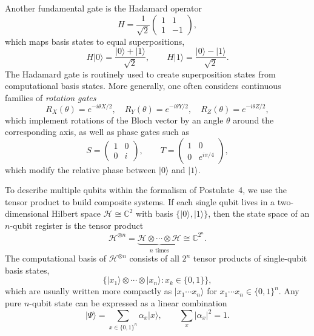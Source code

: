 \documentclass[12pt,a4paper,openany]{report}
\newcommand{\ket}[1]{\lvert #1 \rangle}
\begin{document}
Another fundamental gate is the Hadamard operator
\begin{equation}
  H = \frac{1}{\sqrt{2}}\begin{pmatrix} 1 & 1 \\ 1 & -1 \end{pmatrix},
\end{equation}
which maps basis states to equal superpositions,
\begin{equation}
  H\ket{0} = \frac{\ket{0} + \ket{1}}{\sqrt{2}}, \qquad
  H\ket{1} = \frac{\ket{0} - \ket{1}}{\sqrt{2}}.
\end{equation}
The Hadamard gate is routinely used to create superposition states from computational basis states. More generally, one often considers continuous families of \emph{rotation gates}
\begin{equation}
  R_X(\theta) = e^{-i\theta X/2}, \quad
  R_Y(\theta) = e^{-i\theta Y/2}, \quad
  R_Z(\theta) = e^{-i\theta Z/2},
\end{equation}
which implement rotations of the Bloch vector by an angle $\theta$ around the corresponding axis, as well as phase gates such as
\begin{equation}
  S = \begin{pmatrix} 1 & 0 \\ 0 & i \end{pmatrix}, \qquad
  T = \begin{pmatrix} 1 & 0 \\ 0 & e^{i\pi/4} \end{pmatrix},
\end{equation}
which modify the relative phase between $\ket{0}$ and $\ket{1}$.

To describe multiple qubits within the formalism of Postulate~4, we use the tensor product to build composite systems. If each single qubit lives in a two-dimensional Hilbert space $\mathcal{H} \cong \mathbb{C}^2$ with basis $\{\ket{0},\ket{1}\}$, then the state space of an $n$-qubit register is the tensor product
\begin{equation}
  \mathcal{H}^{\otimes n} = \underbrace{\mathcal{H} \otimes \cdots \otimes \mathcal{H}}_{n \text{ times}} \cong \mathbb{C}^{2^n}.
\end{equation}
The computational basis of $\mathcal{H}^{\otimes n}$ consists of all $2^n$ tensor products of single-qubit basis states,
\begin{equation}
  \{\ket{x_1}\otimes \cdots \otimes \ket{x_n} : x_k \in \{0,1\}\},
\end{equation}
which are usually written more compactly as $\ket{x_1\cdots x_n}$ for $x_1\cdots x_n \in \{0,1\}^n$. Any pure $n$-qubit state can be expressed as a linear combination
\begin{equation}
  \ket{\Psi} = \sum_{x \in \{0,1\}^n} \alpha_x \ket{x}, \qquad \sum_{x} \lvert \alpha_x \rvert^2 = 1.
\end{equation}
\end{document}
